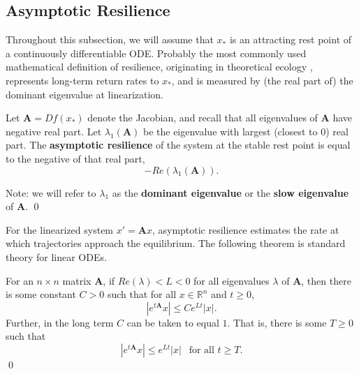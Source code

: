 \subsection{Asymptotic Resilience}
\label{sec:asymp_res}

Throughout this subsection, we will assume that $x_\ast$ is an attracting rest point of a continuously differentiable ODE. Probably the most commonly used mathematical definition of resilience,  originating in theoretical ecology \cite{pimmComplexityStabilityEcosystems1984, mayStabilityComplexityModel1974, hollingResilienceStabilityEcological1973, pimm1991balance}, represents long-term return rates to $x_{\ast}$, and is measured by (the real part of) the dominant eigenvalue at linearization. 

\begin{definition}
	\label{def:asymp}
	 Let $\textbf{A} = Df(x_\ast)$ denote the Jacobian, and recall that all eigenvalues of $\mathbf{A}$ have negative real part. Let $\lambda_1(\textbf{A})$ be the eigenvalue with largest (closest to 0) real part. 	The \textbf{asymptotic resilience} of the system at the stable rest point is equal to the negative of that real part, $$-Re(\lambda_1(\textbf{A})).$$

Note: we will refer to $\lambda_1$ as the \textbf{dominant eigenvalue} or the \textbf{slow eigenvalue} of $\mathbf{A}$. 
	 \qed 
\end{definition}

For the linearized system $x'= \textbf{A}x$, asymptotic resilience estimates the rate at which trajectories approach the equilibrium. The following theorem is standard theory for linear ODEs. %


\begin{theorem}
	For an $n \times n$ matrix $\mathbf{A}$, if $Re(\lambda) < L < 0$ for all eigenvalues $\lambda$ of $\mathbf{A}$, then there is some constant $C>0$ such that for all $x \in \mathbb{R}^n$ and $t \geq 0$,
	$$|e^{t\mathbf{A}}x| \leq Ce^{L t}|x|.$$ 
	Further, in the long term $C$ can be taken to equal $1$. That is, there is some $T \geq 0$ such that
	$$|e^{t\mathbf{A}}x| \leq e^{L t}|x| ~ ~\text{ for all } t \geq T.$$
	 \qed
\end{theorem}

